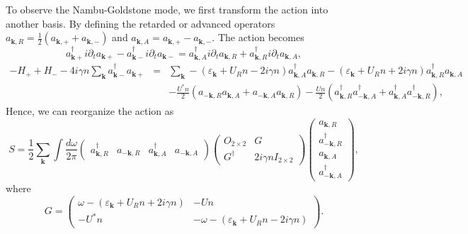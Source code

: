 \documentclass[aps,onecolumn,superscriptaddress,notitlepage,longbibliography]{revtex4-1}
\newcommand{\tmmathbf}[1]{\ensuremath{\boldsymbol{#1}}}
\begin{document}
To observe the Nambu-Goldstone mode, we first transform the action into
another basis. By defining the retarded or advanced operators
$a_{\tmmathbf{k}, R} = \frac{1}{2} (a_{\tmmathbf{k}, +} + a_{\tmmathbf{k},
-})$ and $a_{\tmmathbf{k}, A} = a_{\tmmathbf{k}, +} - a_{\tmmathbf{k}, -}$.
The action becomes
\[ a^{\dagger}_{\tmmathbf{k}+} i \partial_t a_{\tmmathbf{k}+} -
   a^{\dagger}_{\tmmathbf{k}-} i \partial_t a_{\tmmathbf{k}-} =
   a^{\dagger}_{\tmmathbf{k}, A} i \partial_t a_{\tmmathbf{k}, R} +
   a^{\dagger}_{\tmmathbf{k}, R} i \partial_t a_{\tmmathbf{k}, A}, \]
\begin{eqnarray*}
  - H_+ + H_- - 4 i \gamma n \sum_{\tmmathbf{k}} a_{\tmmathbf{k}-}^{\dagger}
  a_{\tmmathbf{k}+} & = & \sum_{\tmmathbf{k}} - (\varepsilon_{\tmmathbf{k}} +
  U_R n - 2 i \gamma n) a_{\tmmathbf{k}, A}^{\dagger} a_{\tmmathbf{k}, R} -
  (\varepsilon_{\tmmathbf{k}} + U_R n + 2 i \gamma n) a_{\tmmathbf{k},
  R}^{\dagger} a_{\tmmathbf{k}, A}\\
  &  & - \frac{U^{\ast} n}{2} (a_{- \tmmathbf{k}, R} a_{\tmmathbf{k}, A} +
  a_{- \tmmathbf{k}, A} a_{\tmmathbf{k}, R}) - \frac{U n}{2} (a_{\tmmathbf{k},
  R}^{\dagger} a^{\dagger}_{- \tmmathbf{k}, A} + a^{\dagger}_{\tmmathbf{k}, A}
  a^{\dagger}_{- \tmmathbf{k}, R}),
\end{eqnarray*}
Hence, we can reorganize the action as
\begin{equation}
  S = \frac{1}{2} \sum_{\tmmathbf{k}} \int \frac{d \omega}{2 \pi}
  \left(\begin{array}{cccc}
    a_{\tmmathbf{k}, R}^{\dagger} & a_{- \tmmathbf{k}, R} & a_{\tmmathbf{k},
    A}^{\dagger} & a_{- \tmmathbf{k}, A}
  \end{array}\right) \left(\begin{array}{cc}
    O_{2 \times 2} & G\\
    G^{\dagger} & 2i \gamma n I_{2 \times 2}
  \end{array}\right) \left(\begin{array}{c}
    a_{\tmmathbf{k}, R}\\
    a_{- \tmmathbf{k}, R}^{\dagger}\\
    a_{\tmmathbf{k}, A}\\
    a_{- \tmmathbf{k}, A}^{\dagger}
  \end{array}\right),
\end{equation}
where
\begin{equation}
  G = \left(\begin{array}{cc}
    \omega - (\varepsilon_{\tmmathbf{k}} + U_R n + 2 i \gamma n) & - U n\\
    - U^{\ast} n & - \omega - (\varepsilon_{\tmmathbf{k}} + U_R n - 2 i \gamma
    n)
  \end{array}\right) .
\end{equation}
\end{document}
